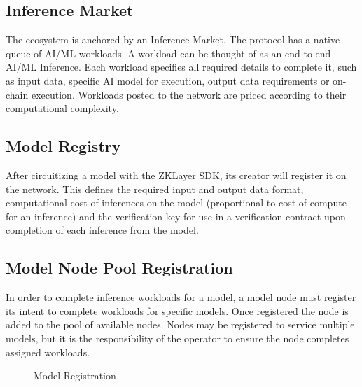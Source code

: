 \documentclass[conference]{IEEEtran}
\begin{document}
\subsection{Inference Market}

The ecosystem is anchored by an Inference Market. The protocol has a native queue of AI/ML workloads. A workload can be thought of as an end-to-end AI/ML Inference. Each workload specifies all required details to complete it, such as input data, specific AI model for execution, output data requirements or on-chain execution. Workloads posted to the network are priced according to their computational complexity.

\subsection{Model Registry}

After circuitizing a model with the ZKLayer SDK, its creator will register it on the network. This defines the required input and output data format, computational cost of inferences on the model (proportional to cost of compute for an inference) and the verification key for use in a verification contract upon completion of each inference from the model.

\subsection{Model Node Pool Registration}

In order to complete inference workloads for a model, a model node must register its intent to complete workloads for specific models. Once registered the node is added to the pool of available nodes. Nodes may be registered to service multiple models, but it is the responsibility of the operator to ensure the node completes assigned workloads.

\begin{figure}[!ht]
    \centering
{}
    \caption{Model Registration}
    \label{fig:Fig 3}
\end{figure}
\end{document}
